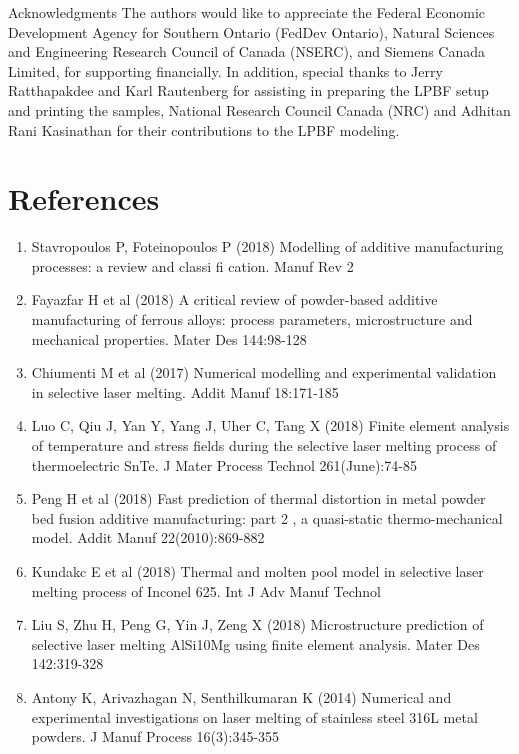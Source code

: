 \documentclass[10pt]{article}
\begin{document}
Acknowledgments The authors would like to appreciate the Federal Economic Development Agency for Southern Ontario (FedDev Ontario), Natural Sciences and Engineering Research Council of Canada (NSERC), and Siemens Canada Limited, for supporting financially. In addition, special thanks to Jerry Ratthapakdee and Karl Rautenberg for assisting in preparing the LPBF setup and printing the samples, National Research Council Canada (NRC) and Adhitan Rani Kasinathan for their contributions to the LPBF modeling.

\section*{References}
\begin{enumerate}
  \item Stavropoulos P, Foteinopoulos P (2018) Modelling of additive manufacturing processes: a review and classi fi cation. Manuf Rev 2

  \item Fayazfar $\mathrm{H}$ et al (2018) A critical review of powder-based additive manufacturing of ferrous alloys: process parameters, microstructure and mechanical properties. Mater Des 144:98-128

  \item Chiumenti M et al (2017) Numerical modelling and experimental validation in selective laser melting. Addit Manuf 18:171-185

  \item Luo C, Qiu J, Yan Y, Yang J, Uher C, Tang X (2018) Finite element analysis of temperature and stress fields during the selective laser melting process of thermoelectric SnTe. J Mater Process Technol 261(June):74-85

  \item Peng $\mathrm{H}$ et al (2018) Fast prediction of thermal distortion in metal powder bed fusion additive manufacturing: part 2 , a quasi-static thermo-mechanical model. Addit Manuf 22(2010):869-882

  \item Kundakc E et al (2018) Thermal and molten pool model in selective laser melting process of Inconel 625. Int J Adv Manuf Technol

  \item Liu S, Zhu H, Peng G, Yin J, Zeng X (2018) Microstructure prediction of selective laser melting AlSi10Mg using finite element analysis. Mater Des 142:319-328

  \item Antony K, Arivazhagan N, Senthilkumaran K (2014) Numerical and experimental investigations on laser melting of stainless steel 316L metal powders. J Manuf Process 16(3):345-355


\end{enumerate}
\end{document}
